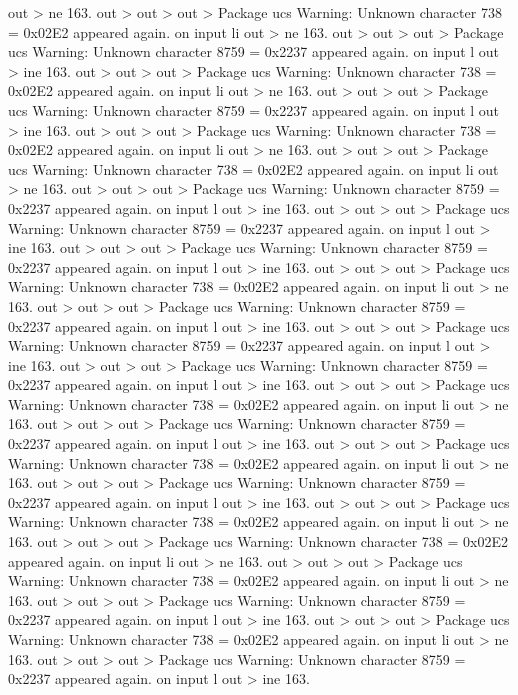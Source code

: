 out > ne 163.
out >
out >
out > Package ucs Warning: Unknown character 738 = 0x02E2 appeared again. on input li
out > ne 163.
out >
out >
out > Package ucs Warning: Unknown character 8759 = 0x2237 appeared again. on input l
out > ine 163.
out >
out >
out > Package ucs Warning: Unknown character 738 = 0x02E2 appeared again. on input li
out > ne 163.
out >
out >
out > Package ucs Warning: Unknown character 8759 = 0x2237 appeared again. on input l
out > ine 163.
out >
out >
out > Package ucs Warning: Unknown character 738 = 0x02E2 appeared again. on input li
out > ne 163.
out >
out >
out > Package ucs Warning: Unknown character 738 = 0x02E2 appeared again. on input li
out > ne 163.
out >
out >
out > Package ucs Warning: Unknown character 8759 = 0x2237 appeared again. on input l
out > ine 163.
out >
out >
out > Package ucs Warning: Unknown character 8759 = 0x2237 appeared again. on input l
out > ine 163.
out >
out >
out > Package ucs Warning: Unknown character 8759 = 0x2237 appeared again. on input l
out > ine 163.
out >
out >
out > Package ucs Warning: Unknown character 738 = 0x02E2 appeared again. on input li
out > ne 163.
out >
out >
out > Package ucs Warning: Unknown character 8759 = 0x2237 appeared again. on input l
out > ine 163.
out >
out >
out > Package ucs Warning: Unknown character 8759 = 0x2237 appeared again. on input l
out > ine 163.
out >
out >
out > Package ucs Warning: Unknown character 8759 = 0x2237 appeared again. on input l
out > ine 163.
out >
out >
out > Package ucs Warning: Unknown character 738 = 0x02E2 appeared again. on input li
out > ne 163.
out >
out >
out > Package ucs Warning: Unknown character 8759 = 0x2237 appeared again. on input l
out > ine 163.
out >
out >
out > Package ucs Warning: Unknown character 738 = 0x02E2 appeared again. on input li
out > ne 163.
out >
out >
out > Package ucs Warning: Unknown character 8759 = 0x2237 appeared again. on input l
out > ine 163.
out >
out >
out > Package ucs Warning: Unknown character 738 = 0x02E2 appeared again. on input li
out > ne 163.
out >
out >
out > Package ucs Warning: Unknown character 738 = 0x02E2 appeared again. on input li
out > ne 163.
out >
out >
out > Package ucs Warning: Unknown character 738 = 0x02E2 appeared again. on input li
out > ne 163.
out >
out >
out > Package ucs Warning: Unknown character 8759 = 0x2237 appeared again. on input l
out > ine 163.
out >
out >
out > Package ucs Warning: Unknown character 738 = 0x02E2 appeared again. on input li
out > ne 163.
out >
out >
out > Package ucs Warning: Unknown character 8759 = 0x2237 appeared again. on input l
out > ine 163.
